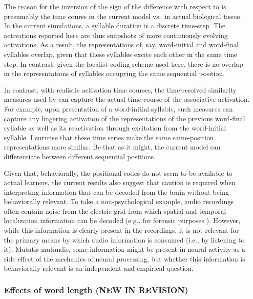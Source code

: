 \documentclass[
]{article}
\begin{document}
The reason for the inversion of the sign of the difference with respect
to \citep{Henin2021} is presumably the time course in the current model
vs.~in actual biological tissue. In the current simulations, a syllable
duration is a discrete time-step. The activations reported here are thus
snapshots of more continuously evolving activations. As a result, the
representations of, say, word-initial and word-final syllables overlap,
given that these syllables excite each other in the same time step. In
contrast, given the localist coding scheme used here, there is no
overlap in the representations of syllables occupying the same
sequential position.

In contrast, with realistic activation time courses, the time-resolved
similarity measures used by \citep{Henin2021} can capture the actual
time course of the associative activation. For example, upon
presentation of a word-initial syllable, such measures can capture any
lingering activation of the representations of the previous word-final
syllable as well as its reactivation through excitation from the
word-initial syllable. I surmise that these time series make the same
same-position representations more similar. Be that as it might, the
current model can differentiate between different sequential positions.

Given that, behaviorally, the positional codes do not seem to be
available to actual learners, the current results also suggest that
caution is required when interpreting information that can be decoded
from the brain without being behaviorally relevant. To take a
non-psychological example, audio recordings often contain noise from the
electric grid from which spatial and temporal localization information
can be decoded (e.g., for forensic purposes \citep{Grigoras2005}).
However, while this information is clearly present in the recordings, it
is not relevant for the primary means by which audio information is
consumed (i.e., by listening to it). Mutatis mutandis, some information
might be present in neural activity as a side effect of the mechanics of
neural processing, but whether this information is behaviorally relevant
is an independent and empirical question.

\hypertarget{effects-of-word-length-new-in-revision}{%
\subsubsection{Effects of word length (NEW IN
REVISION)}\label{effects-of-word-length-new-in-revision}}
\end{document}

